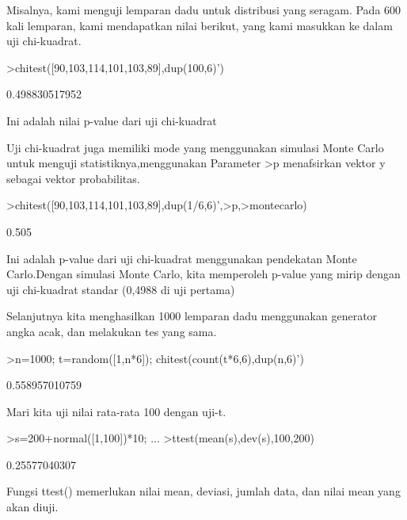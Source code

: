 \documentclass[a4paper,10pt]{article}
\begin{document}
\begin{eulernotebook}
\begin{eulercomment}
\begin{eulercomment}
\begin{eulercomment}
Misalnya, kami menguji lemparan dadu untuk distribusi yang seragam.
Pada 600 kali lemparan, kami mendapatkan nilai berikut, yang kami
masukkan ke dalam uji chi-kuadrat.
\end{eulercomment}
\begin{eulerprompt}
>chitest([90,103,114,101,103,89],dup(100,6)')
\end{eulerprompt}
\begin{euleroutput}
  0.498830517952
\end{euleroutput}
\begin{eulercomment}
Ini adalah nilai p-value dari uji chi-kuadrat

Uji chi-kuadrat juga memiliki mode yang menggunakan simulasi Monte
Carlo untuk menguji statistiknya,menggunakan Parameter \textgreater{}p menafsirkan
vektor y sebagai vektor probabilitas.
\end{eulercomment}
\begin{eulerprompt}
>chitest([90,103,114,101,103,89],dup(1/6,6)',>p,>montecarlo)
\end{eulerprompt}
\begin{euleroutput}
  0.505
\end{euleroutput}
\begin{eulercomment}
Ini adalah p-value dari uji chi-kuadrat menggunakan pendekatan Monte
Carlo.Dengan simulasi Monte Carlo, kita memperoleh p-value yang mirip
dengan uji chi-kuadrat standar (0,4988 di uji pertama)

Selanjutnya kita menghasilkan 1000 lemparan dadu menggunakan generator
angka acak, dan melakukan tes yang sama.
\end{eulercomment}
\begin{eulerprompt}
>n=1000; t=random([1,n*6]); chitest(count(t*6,6),dup(n,6)')
\end{eulerprompt}
\begin{euleroutput}
  0.558957010759
\end{euleroutput}
\begin{eulercomment}
Mari kita uji nilai rata-rata 100 dengan uji-t.
\end{eulercomment}
\begin{eulerprompt}
>s=200+normal([1,100])*10; ...
>ttest(mean(s),dev(s),100,200)
\end{eulerprompt}
\begin{euleroutput}
  0.25577040307
\end{euleroutput}
\begin{eulercomment}
Fungsi ttest() memerlukan nilai mean, deviasi, jumlah data, dan nilai
mean yang akan diuji.


\end{eulercomment}
\end{eulercomment}
\end{eulercomment}
\end{eulernotebook}
\end{document}
